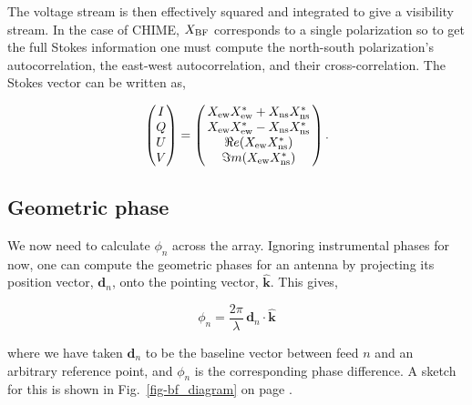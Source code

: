 The voltage stream is then effectively squared and integrated 
to give a visibility stream. 
In the case of CHIME, $X_{\rm BF}$ corresponds to a single polarization 
so to get the full Stokes information one must compute the 
north-south polarization's autocorrelation, the east-west autocorrelation, 
and their cross-correlation. The Stokes vector can be written as,

\begin{equation}
\begin{pmatrix}
I \\ 
Q \\ 
U\\ 
V
\end{pmatrix}
= \begin{pmatrix}
\, X_{\rm ew} X_{\rm ew}^* + X_{\rm ns} X_{\rm ns}^*\, \\ 
\, X_{\rm ew} X_{\rm ew}^* - X_{\rm ns} X_{\rm ns}^* \,\\ 
\, \Re e(X_{\rm ew} X_{\rm ns}^*)\,\\ 
\, \Im m(X_{\rm ew} X_{\rm ns}^*)\,
\end{pmatrix}.
\end{equation}



\subsection{Geometric phase}

We now need to calculate $\phi_n$ across the array.
Ignoring instrumental phases for now, one can compute the geometric 
phases for an antenna by projecting its position vector, $\mathbf{d}_n$, 
onto the pointing vector, $\hat{\mathbf{k}}$. This gives,

\begin{equation}
\label{eqn-phi_n}
\phi_n = \frac{2\pi}{\lambda} \, \mathbf{d}_n \cdot  {\mathbf{\hat{k}}}
\end{equation}

\noindent where we have taken $\mathbf{d}_n$ to be the baseline vector between 
feed $n$ and an arbitrary reference point, and $\phi_n$ is the corresponding 
phase difference. A sketch for this is shown in Fig.~\ref{fig-bf_diagram} on page 
\pageref{fig-bf_diagram}.


